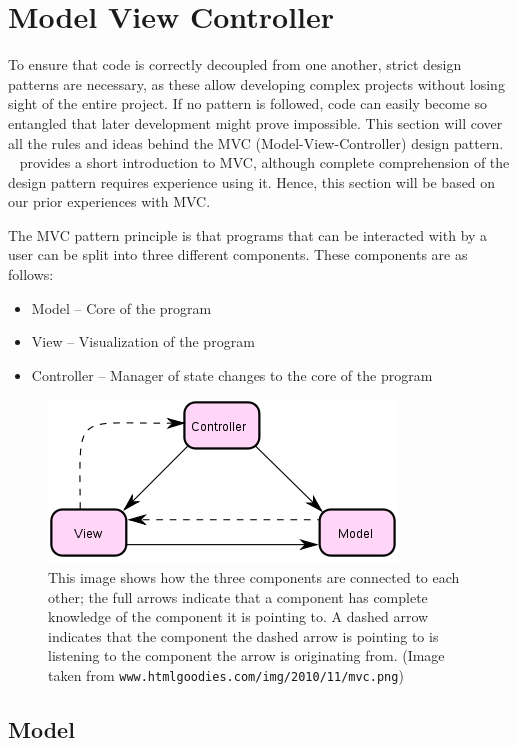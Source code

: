 
\section{Model View Controller}

To ensure that code is correctly decoupled from one another, strict
design patterns are necessary, as these allow developing complex projects
without losing sight of the entire project. If no pattern is followed,
code can easily become so entangled that later development might prove
impossible. This section will cover all the rules and ideas behind
the MVC (Model-View-Controller) design pattern. ~\cite{WikiMVC} provides
a short introduction to MVC, although complete comprehension of the
design pattern requires experience using it. Hence, this section will
be based on our prior experiences with MVC.

The MVC pattern principle is that programs that can be interacted
with by a user can be split into three different components. These
components are as follows:
\begin{itemize}
\item Model -- Core of the program
\item View -- Visualization of the program
\item Controller -- Manager of state changes to the core of the program
\end{itemize}
\begin{figure}
\centering{}\includegraphics{MVC}\caption{\label{fig:MVCBasic}This image shows how the three components are
connected to each other; the full arrows indicate that a component
has complete knowledge of the component it is pointing to. A dashed
arrow indicates that the component the dashed arrow is pointing to
is listening to the component the arrow is originating from. (Image
taken from \texttt{www.htmlgoodies.com/img/2010/11/mvc.png})}
\end{figure}



\subsection{Model}

